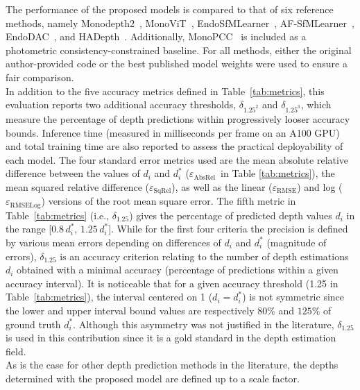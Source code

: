 \documentclass[a4paper,fleqn]{cas-dc}
\begin{document}
 The performance of the proposed models is compared to that of six reference methods, namely Monodepth2~\citep{Godard_ICCV_2019}, MonoViT~\citep{Zhao_3DV_2022}, 
EndoSfMLearner~\citep{Ozyoruk_MIA_2021}, AF-SfMLearner~\citep{Shao_MIA_2022}, EndoDAC~\citep{EndoDAC_MICCAI_2024}, and HADepth~\citep{HAdepth_2025}. Additionally, MonoPCC~\citep{wang2025monopcc}  is included as a photometric consistency-constrained baseline. For all methods, either the original author-provided code or the best published model weights were used to ensure a fair comparison. \\
%
In addition to the five accuracy metrics defined in Table~\ref{tab:metrics}, this evaluation reports 
two additional accuracy thresholds, $\delta_{1.25^2}$ and $\delta_{1.25^3}$, which measure the percentage 
of depth predictions within progressively \textcolor{black}{looser} accuracy bounds. Inference time (measured in milliseconds per frame on an A100 GPU) and total training time are also reported to assess the practical deployability of each model.
%
The four standard error metrics used are the mean absolute relative difference between the values of $d_i$ and $d_i^*$ ($\varepsilon_\textrm{AbsRel}$~in Table \ref{tab:metrics}), the mean squared relative difference ($\varepsilon_\textrm{SqRel}$), as well as the linear ($\varepsilon_\textrm{RMSE}$) and log ($\varepsilon_\textrm{RMSELog}$) versions  of the root mean square error. 
%
The fifth metric in Table~\ref{tab:metrics} (i.e., $\delta_{1.25}$)  gives the percentage of predicted depth values $d_i$  in the range  [$0.8\,d_i^*$, $1.25\,d_i^*$]. While for the first four criteria the precision is defined by various mean errors depending on differences of $d_i$ and $d_i^*$ (magnitude of errors), $\delta_{1.25}$ is an accuracy criterion relating to the number of depth estimations $d_i$ obtained with a minimal accuracy (percentage of predictions within a given accuracy interval). It is noticeable that for a given accuracy threshold (1.25 in Table~\ref{tab:metrics}), the interval centered on 1 ($d_i = d_i^*$) is not symmetric since the lower and upper interval bound values are respectively $80\%$ and $125\%$ of ground truth $d_i^*$. Although this asymmetry was not justified in the literature, $\delta_{1.25}$ is used in this contribution since it is a gold standard in the depth estimation field. \vspace*{1mm} \\ 
%
As is the case for other depth prediction methods in the literature, the depths determined with the proposed model are defined up to a scale factor. 
\end{document}
